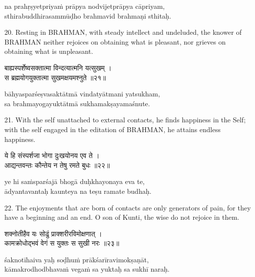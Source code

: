 \begin{transliteration}
na prahṛṣyetpriyaṁ prāpya nodvijetprāpya cāpriyam, \\
sthirabuddhirasammūḍho brahmavid brahmaṇi sthitaḥ.
\end{transliteration}

20. Resting in BRAHMAN, with steady intellect and undeluded, the knower of
BRAHMAN neither rejoices on obtaining what is pleasant, nor grieves on
obtaining what is unpleasant.

\begin{gitaverse}
बाह्यस्पर्शेष्वसक्तात्मा विन्दत्यात्मनि यत्सुखम् । \\
स ब्रह्मयोगयुक्तात्मा सुखमक्षयमश्नुते ॥२१॥
\end{gitaverse}

\begin{transliteration}
bāhyasparśeṣvasaktātmā vindatyātmani yatsukham, \\
sa brahmayogayuktātmā sukhamakṣayamaśnute.
\end{transliteration}

21. With the self unattached to external contacts, he finds happiness in the
Self; with the self engaged in the editation of BRAHMAN, he attains endless
happiness.

\begin{gitaverse}
ये हि संस्पर्शजा भोगा दुःखयोनय एव ते । \\
आद्यन्तवन्तः कौन्तेय न तेषु रमते बुधः ॥२२॥
\end{gitaverse}

\begin{transliteration}
ye hi saṁsparśajā bhogā duḥkhayonaya eva te, \\
ādyantavantaḥ kaunteya na teṣu ramate budhaḥ.
\end{transliteration}

22. The enjoyments that are born of contacts are only generators of pain, for
they have a beginning and an end. O son of Kunti, the wise do not rejoice in
them.

\begin{gitaverse}
शक्नोतीहैव यः सोढुं प्राक्शरीरविमोक्षणात् । \\
कामक्रोधोद्भवं वेगं स युक्तः स सुखी नरः ॥२३॥
\end{gitaverse}

\begin{transliteration}
śaknotīhaiva yaḥ soḍhuṁ prākśarīravimokṣaṇāt, \\
kāmakrodhodbhavaṁ vegaṁ sa yuktaḥ sa sukhī naraḥ.
\end{transliteration}

